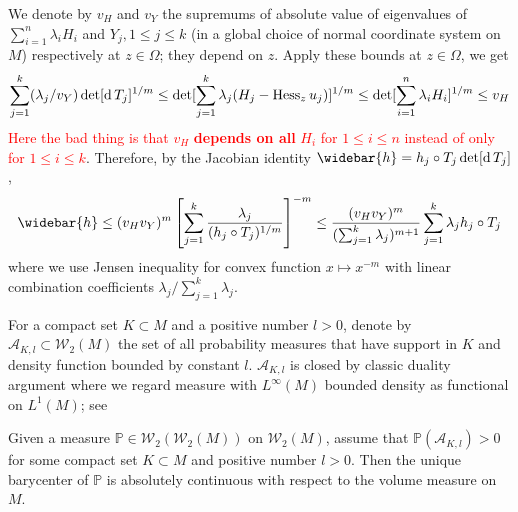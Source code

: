 We denote by $v_H$ and $v_Y$ the supremums of absolute value
of eigenvalues of $\sum_{i=1}^n \lambda_i H_i$ and $Y_j, 1 \leq j \leq k$
(in a global choice of normal coordinate system on $M$)
respectively at $z \in \Omega$;
they depend on $z$.
Apply these bounds at $z \in \Omega$, we get
\begin{equation}
	\label{equa:bound_v_H}
	\sum_{j=1}^k (\lambda_j / v_Y) \det [ \operatorname{d} T_j]^{1/m} \leq
	\det[\sum_{j=1}^k \lambda_j (H_j - \operatorname{Hess}_z u_j)]^{1/m}\leq
	\det [\sum_{i=1}^n \lambda_i H_i]^{1/m}
	\leq v_H
\end{equation}
\textcolor{red}{Here the bad thing is that $v_H$ \textbf{depends on all} $H_i$ for $ 1 \leq i \leq n$
instead of only for $1 \leq i \leq k$}.
Therefore, by the Jacobian identity $\widebar{h} = h_j \circ T_j \det [\diff T_j]$,
\begin{equation}
	\label{equa:density_inequality}
	\widebar{h} \leq (v_H v_Y)^m \left[  \sum_{j=1}^k \frac{ \lambda_j }
		{ (h_j \circ T_j)^{1/m}} \right]^{-m}
	\leq \frac{ (v_H v_Y)^m }{(\sum_{j=1}^k \lambda_j)^{m+1}}
	\sum_{j=1}^k \lambda_j h_j \circ T_j
\end{equation}
where we use Jensen inequality for convex function $x \mapsto x^{-m}$
with linear combination coefficients $\lambda_j / \sum_{j=1}^k \lambda_j$.

For a compact set $K \subset M$ and a positive number $l > 0$,
denote by $\mathcal{A}_{K, l} \subset \mathcal{W}_2(M)$ the set of
all probability measures that have support in $K$ and density function bounded by constant $l$.
$\mathcal{A}_{K, l}$ is closed by classic duality argument
where we regard measure with $L^\infty (M)$ bounded density as functional on $L^1(M)$;
see \cite[Theorem 4.4.1]{Bogachev2007}

\begin{conj}
	\label{thm:absolute_continuity_general}
	Given a measure $\mathbb{P} \in \mathcal{W}_2(\mathcal{W}_2(M))$ on $\mathcal{W}_2(M)$,
	assume that $\mathbb{P}(\mathcal{A}_{K,l}) >0$ for some compact set $K \subset M$ and positive
	number $l > 0$.
	Then the unique barycenter of $\mathbb{P}$
	is absolutely continuous with respect to the volume measure on $M$.
\end{conj}

